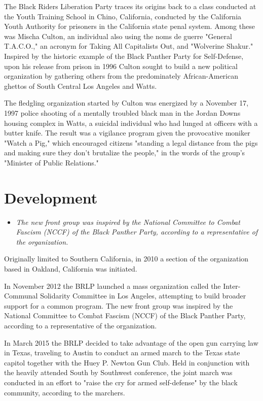 The Black Riders Liberation Party traces its origins back to a class
conducted at the Youth Training School in Chino, California, conducted
by the California Youth Authority for prisoners in the California state
penal system. Among these was Mischa Culton, an individual also using
the noms de guerre "General T.A.C.O.," an acronym for Taking All
Capitalists Out, and "Wolverine Shakur." Inspired by the historic
example of the Black Panther Party for Self-Defense, upon his release
from prison in 1996 Culton sought to build a new political organization
by gathering others from the predominately African-American ghettos of
South Central Los Angeles and Watts.

The fledgling organization started by Culton was energized by a November
17, 1997 police shooting of a mentally troubled black man in the Jordan
Downs housing complex in Watts, a suicidal individual who had lunged at
officers with a butter knife. The result was a vigilance program given
the provocative moniker "Watch a Pig," which encouraged citizens
"standing a legal distance from the pigs and making sure they don't
brutalize the people," in the words of the group's "Minister of Public
Relations."

\section{Development}\label{development}

\begin{itemize}
\item
  \emph{The new front group was inspired by the National Committee to
  Combat Fascism (NCCF) of the Black Panther Party, according to a
  representative of the organization.}
\end{itemize}

Originally limited to Southern California, in 2010 a section of the
organization based in Oakland, California was initiated.

In November 2012 the BRLP launched a mass organization called the
Inter-Communal Solidarity Committee in Los Angeles, attempting to build
broader support for a common program. The new front group was inspired
by the National Committee to Combat Fascism (NCCF) of the Black Panther
Party, according to a representative of the organization.

In March 2015 the BRLP decided to take advantage of the open gun
carrying law in Texas, traveling to Austin to conduct an armed march to
the Texas state capitol together with the Huey P. Newton Gun Club. Held
in conjunction with the heavily attended South by Southwest conference,
the joint march was conducted in an effort to "raise the cry for armed
self-defense" by the black community, according to the marchers.

